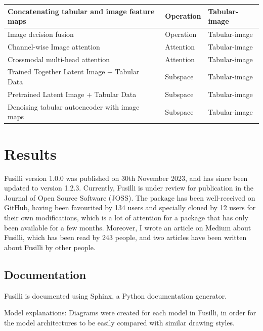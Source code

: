 \begin{table}[!ht]
\begin{tabular}{|p{8cm}ll|}
        Concatenating tabular and image feature maps~\cite{gaoReducingUncertaintyCancer2022} & Operation & Tabular-image \\ \hline
        Image decision fusion & Operation & Tabular-image \\ \hline 
        Channel-wise Image attention~\cite{duanmuPredictionPathologicalComplete2020} & Attention & Tabular-image \\ \hline
        Crossmodal multi-head attention~\cite{golovanevskyMultimodalAttentionbasedDeep2022} & Attention & Tabular-image \\ \hline
        Trained Together Latent Image + Tabular Data~\cite{zhaoMultimodalDeepLearning2022} & Subspace & Tabular-image \\ \hline
        Pretrained Latent Image + Tabular Data~\cite{zhaoMultimodalDeepLearning2022} & Subspace & Tabular-image \\ \hline
        Denoising tabular autoencoder with image maps~\cite{yanRicherFusionNetwork2021} & Subspace & Tabular-image \\ \hline
    \end{tabular}
\end{table}

\section{Results}

Fusilli version 1.0.0 was published on 30th November 2023, and has since been updated to version 1.2.3.
Currently, Fusilli is under review for publication in the Journal of Open Source Software (JOSS).
The package has been well-received on GitHub, having been favourited by 134 users and specially cloned by 12 users for their own modifications, which is a lot of attention for a package that has only been available for a few months.
Moreover, I wrote an article on Medium about Fusilli, which has been read by 243 people, and two articles have been written about Fusilli by other people.

\subsection{Documentation}

Fusilli is documented using Sphinx, a Python documentation generator.

Model explanations: Diagrams were created for each model in Fusilli, in order for the model architectures to be easily compared with similar drawing styles.

